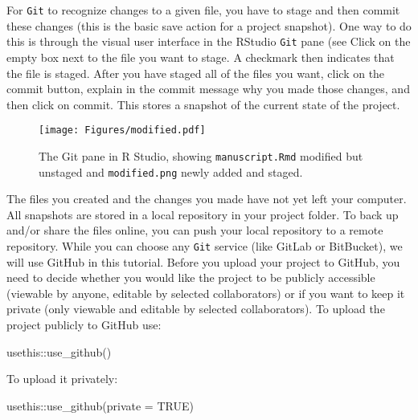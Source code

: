 \documentclass[psych,tutorial,accept,moreauthors,pdftex]{Definitions/mdpi}
\newenvironment{Shaded}{\begin{snugshade}}{\end{snugshade}}
\newcommand{\AttributeTok}[1]{\textcolor[rgb]{0.77,0.63,0.00}{#1}}
\newcommand{\ConstantTok}[1]{\textcolor[rgb]{0.00,0.00,0.00}{#1}}
\newcommand{\FunctionTok}[1]{\textcolor[rgb]{0.00,0.00,0.00}{#1}}
\newcommand{\NormalTok}[1]{#1}
\newcommand{\SpecialCharTok}[1]{\textcolor[rgb]{0.00,0.00,0.00}{#1}}
\begin{document}
\begin{paracol}{2}
For \texttt{Git} to recognize changes to a given file, you have to stage
and then commit these changes (this is the basic save action for a
project snapshot). One way to do this is through the visual user
interface in the RStudio \texttt{Git} pane (see 
 Click on
the empty box next to the file you want to stage. A checkmark then
indicates that the file is staged. After you have staged all of the
files you want, click on the commit button, explain in the commit
message why you made those changes, and then click on commit. This
stores a snapshot of the current state of the project.

\begin{figure}[H]
\texttt{[image: Figures/modified.pdf]}
\caption{The Git pane in R Studio, showing
\texttt{manuscript.Rmd} modified but unstaged and \texttt{modified.png}
newly added and staged.}
\label{figure2}
\end{figure}

The files you created and the changes you made have not yet left your
computer. All snapshots are stored in a local repository in your project
folder. To back up and/or share the files online, you can push your
local repository to a remote repository. While you can choose any
\texttt{Git} service (like GitLab or BitBucket), we will use GitHub in
this tutorial. Before you upload your project to GitHub, you need to
decide whether you would like the project to be publicly accessible
(viewable by anyone, editable by selected collaborators) or if you want
to keep it private (only viewable and editable by selected
collaborators). To upload the project publicly to GitHub use:

\begin{adjustwidth}{0.5cm}{0cm} 
\begin{Shaded}
\begin{Highlighting}[]
\NormalTok{usethis}\SpecialCharTok{::}\FunctionTok{use\_github}\NormalTok{()}
\end{Highlighting}
\end{Shaded}
\end{adjustwidth}

To upload it privately:

\begin{adjustwidth}{0.5cm}{0cm} 
\begin{Shaded}
\begin{Highlighting}[]
\NormalTok{usethis}\SpecialCharTok{::}\FunctionTok{use\_github}\NormalTok{(}\AttributeTok{private =} \ConstantTok{TRUE}\NormalTok{)}
\end{Highlighting}
\end{Shaded}
\end{adjustwidth}


\end{paracol}
\end{document}
